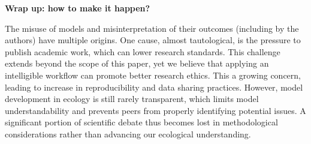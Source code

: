 \documentclass[11pt]{article}
\begin{document}

\vspace{0.5cm}
\noindent \textbf{Wrap up: how to make it happen?}

The misuse of models and misinterpretation of their outcomes (including by the authors) have multiple origins. One cause, almost tautological, is the pressure to publish academic work, which can lower research standards. This challenge extends beyond the scope of this paper, yet we believe that applying an intelligible workflow can promote better research ethics.
This a growing concern, leading to increase in reproducibility and data sharing practices.
However, model development in ecology is still rarely transparent, which limits model understandability and prevents peers from properly identifying potential issues. A significant portion of scientific debate thus becomes lost in methodological considerations rather than advancing our ecological understanding.
\end{document}
